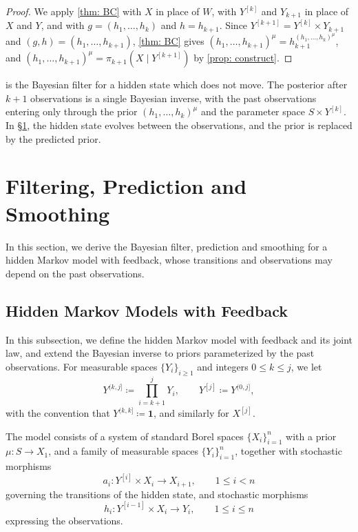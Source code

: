 \documentclass[12pt,reqno]{amsart}%
\theoremstyle{plain}
\theoremstyle{definition}
\def\bsone{\boldsymbol{1}}
\begin{document}
\begin{proof}
	We apply \cref{thm: BC} with $X$ in place of $W$, with $Y^{[k]}$ and $Y_{k+1}$ in place of $X$ and $Y$,
	and with $g=(h_1,\ldots,h_k)$ and $h=h_{k+1}$.
	Since $Y^{[k+1]}=Y^{[k]}\times Y_{k+1}$ and $(g,h)=(h_1,\ldots,h_{k+1})$,
	\cref{thm: BC} gives
	$(h_1,\ldots,h_{k+1})^\mu=h_{k+1}^{(h_1,\ldots,h_k)^\mu}$,
	and $(h_1,\ldots,h_{k+1})^\mu=\pi_{k+1}(X\mid Y^{[k+1]})$ by \cref{prop: construct}.
\end{proof}

 is the Bayesian filter for a hidden state which does not move.
The posterior after $k+1$ observations is a single Bayesian inverse,
with the past observations entering only through the prior $(h_1,\ldots,h_k)^\mu$ and the parameter space $S\times Y^{[k]}$.
In \S\ref{sec: filter}, the hidden state evolves between the observations, and the prior is replaced by the predicted prior.


%
%
%
\section{Filtering, Prediction and Smoothing}\label{sec: filter}
%
%
%

In this section, we derive the Bayesian filter, prediction and smoothing for a hidden Markov model with feedback,
whose transitions and observations may depend on the past observations.

\subsection{Hidden Markov Models with Feedback}

In this subsection, we define the hidden Markov model with feedback and its joint law,
and extend the Bayesian inverse to priors parameterized by the past observations.
For measurable spaces $\{Y_i\}_{i\geq1}$ and integers $0\leq k\leq j$, we let
\[
	Y^{(k,j]}\coloneqq\prod_{i=k+1}^jY_i,\qquad Y^{[j]}\coloneqq Y^{(0,j]},
\]
with the convention that $Y^{(k,k]}\coloneqq\bsone$, and similarly for $X^{[j]}$.

\begin{definition}\label{def: HMP}
	The model consists of a system of standard Borel spaces $\{X_i\}_{i=1}^n$
	with a prior $\mu\colon S\rightarrow X_1$,
	and a family of measurable spaces $\{Y_i\}_{i=1}^n$,
	together with
	stochastic morphisms
	\[
		a_i\colon Y^{[i]}\times X_i\rightarrow X_{i+1},\qquad 1\leq i < n
	\]
	governing the transitions of the hidden state, and
	stochastic morphisms
	\[
		h_i\colon Y^{[i-1]}\times X_i\rightarrow Y_i,\qquad 1\leq i\leq n
	\]
	expressing the observations.
\end{definition}
\end{document}
